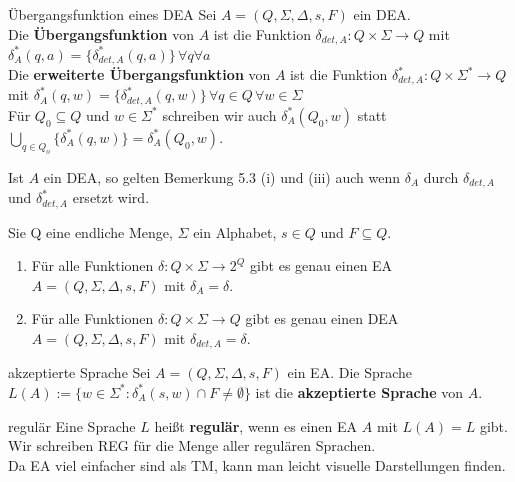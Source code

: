 \begin{defn}{Übergangsfunktion eines DEA}
    Sei $A = (Q,\Sigma,\Delta,s,F)$ ein DEA. \\
    
    Die \textbf{Übergangsfunktion} von $A$ ist die Funktion $\delta_{det,A}: Q \times \Sigma \rightarrow Q$ mit
    $\delta^*_A(q,a) = \{\delta^*_{det,A}(q,a)\} \, \forall q \forall a$ \\

    Die \textbf{erweiterte Übergangsfunktion} von $A$ ist die Funktion $\delta^*_{det,A} : Q \times \Sigma^* \rightarrow Q$
    mit $\delta^*_A(q,w) = \{\delta^*_{det,A}(q,w)\} \, \forall q \in Q \, \forall w \in \Sigma$ \\

    Für $Q_0 \subseteq Q$ und $w \in \Sigma^*$ schreiben wir auch $\delta^*_A(Q_0,w)$ statt $\bigcup\limits_{q \in Q_o}\{\delta^*_A(q,w)\} = \delta^*_A(Q_0,w)$.
\end{defn}

\begin{bem}
    Ist $A$ ein DEA, so gelten Bemerkung 5.3 (i) und (iii) auch wenn $\delta_A$ durch $\delta_{det,A}$ und $\delta^*_{det,A}$ ersetzt wird.
\end{bem}

\begin{bem}
    Sie Q eine endliche Menge, $\Sigma$ ein Alphabet, $s \in Q$ und $F \subseteq Q$. \\
    \begin{enumerate}
        \item Für alle Funktionen $\delta : Q \times \Sigma \rightarrow 2^Q$ gibt es genau einen EA $A = (Q,\Sigma,\Delta,s,F)$ mit $\delta_A = \delta$.
        \item Für alle Funktionen $\delta : Q \times \Sigma \rightarrow Q$ gibt es genau einen DEA $A =(Q,\Sigma, \Delta, s,F)$ mit $\delta_{det,A} = \delta$.
    \end{enumerate}
\end{bem}

\begin{defn}{akzeptierte Sprache}
    Sei $A = (Q,\Sigma, \Delta,s,F)$ ein EA. Die Sprache $L(A) := \{w \in \Sigma^* : \delta^*_A(s,w) \cap F \neq \emptyset\}$ ist die \textbf{akzeptierte Sprache} von $A$.
\end{defn}

\begin{defn}{regulär}
    Eine Sprache $L$ heißt \textbf{regulär}, wenn es einen EA $A$ mit $L(A) = L$ gibt. Wir schreiben REG für die Menge aller regulären Sprachen. \\

    Da EA viel einfacher sind als TM, kann man leicht visuelle Darstellungen finden.
\end{defn}

